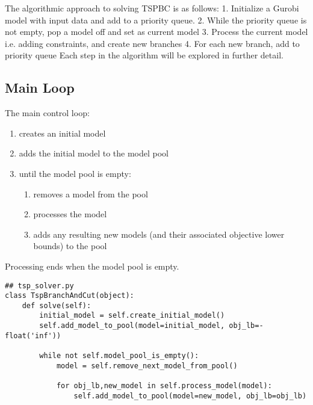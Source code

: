 \documentclass{article}
\begin{document}
The algorithmic approach to solving TSPBC is as follows:
1. Initialize a Gurobi model with input data and add to a priority queue.
2. While the priority queue is not empty, pop a model off and set as current model
3. Process the current model i.e. adding constraints, and create new branches
4. For each new branch, add to priority queue
Each step in the algorithm will be explored in further detail.

\subsection{Main Loop}
\begin{flushleft}

The main control loop:

\begin{enumerate}
\item creates an initial model
\item adds the initial model to the model pool
\item until the model pool is empty:
  \begin{enumerate}
  \item removes a model from the pool
  \item processes the model
  \item adds any resulting new models (and their associated objective lower bounds) to the pool
  \end{enumerate}
\end{enumerate}

Processing ends when the model pool is empty.

\begin{lstlisting}
## tsp_solver.py
class TspBranchAndCut(object):
    def solve(self):
        initial_model = self.create_initial_model()
        self.add_model_to_pool(model=initial_model, obj_lb=-float('inf'))

        while not self.model_pool_is_empty():
            model = self.remove_next_model_from_pool()

            for obj_lb,new_model in self.process_model(model):
                self.add_model_to_pool(model=new_model, obj_lb=obj_lb)
\end{lstlisting}

\end{flushleft}
\end{document}
